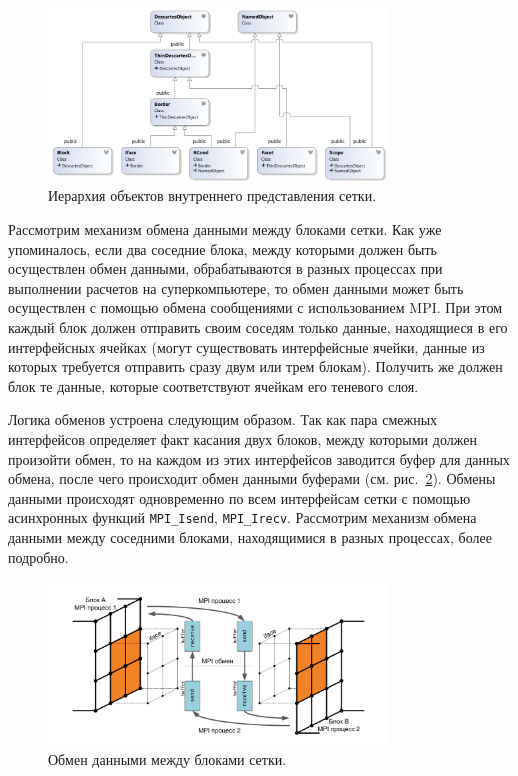 \begin{figure}[ht]
\centering
\includegraphics[width=0.8\textwidth]{fig/par_9-hierarchy.png}
\singlespacing
{}\caption{Иерархия объектов внутреннего представления сетки.}
\label{fig:text_2_block_hierarchy}
\end{figure}

Рассмотрим механизм обмена данными между блоками сетки.
Как уже упоминалось, если два соседние блока, между которыми должен быть осуществлен обмен данными, обрабатываются в разных процессах при выполнении расчетов на суперкомпьютере, то обмен данными может быть осуществлен с помощью обмена сообщениями с использованием MPI.
При этом каждый блок должен отправить своим соседям только данные, находящиеся в его интерфейсных ячейках (могут существовать интерфейсные ячейки, данные из которых требуется отправить сразу двум или трем блокам).
Получить же должен блок те данные, которые соответствуют ячейкам его теневого слоя.

Логика обменов устроена следующим образом.
Так как пара смежных интерфейсов определяет факт касания двух блоков, между которыми должен произойти обмен, то на каждом из этих интерфейсов заводится буфер для данных обмена, после чего происходит обмен данными буферами (см. рис.~\ref{fig:text_2_block_data_exchange}).
Обмены данными происходят одновременно по всем интерфейсам сетки с помощью асинхронных функций
\texttt{MPI\_Isend}, \texttt{MPI\_Irecv}.
Рассмотрим механизм обмена данными между соседними блоками, находящимися в разных процессах, более подробно.

\begin{figure}[ht]
\centering
\includegraphics[width=0.8\textwidth]{fig/par_10-data-exchange.pdf}
\singlespacing
{}\caption{Обмен данными между блоками сетки.}
\label{fig:text_2_block_data_exchange}
\end{figure}

